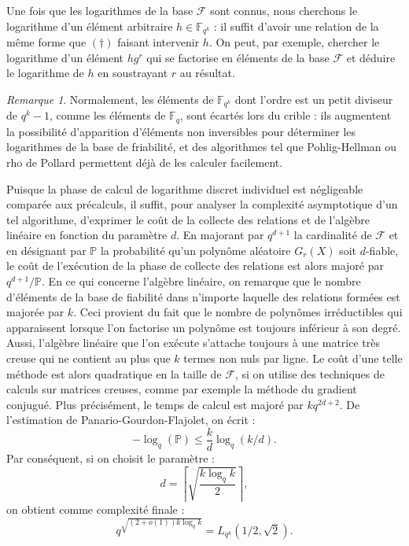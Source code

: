 \documentclass[a4paper, titlepage, 11pt]{article}
\theoremstyle{definition}
\theoremstyle{remark}
\newtheorem{rema}[theo]{Remarque}
\def\o{o}
\def\gf #1{\mathbb{F}_{#1}}
\begin{document}
Une fois que les logarithmes de la base $\mathcal{F}$ sont connus, nous cherchons le logarithme d'un élément arbitraire $h \in \gf{q^k}$ : il suffit d'avoir une relation de la même forme que $(\dagger)$ faisant intervenir $h$. On peut, par exemple, chercher le logarithme d'un élément $hg^r$ qui se factorise en éléments de la base $\mathcal{F}$ et déduire le logarithme de $h$ en soustrayant $r$ au résultat.

\begin{rema}
Normalement, les éléments de $\gf{q^k}$ dont l'ordre est un petit diviseur de $q^k-1$, comme les éléments de $\gf{q}$, sont écartés lors du crible : ils augmentent la possibilité d'apparition d'éléments non inversibles pour déterminer les logarithmes de la base de friabilité, et des algorithmes tel que Pohlig-Hellman \cite{pohligHellman1978} ou rho de Pollard \cite{pollard1978} permettent déjà de les calculer facilement.
\end{rema}

Puisque la phase de calcul de logarithme discret individuel est négligeable comparée aux précalculs, il suffit, pour analyser la complexité asymptotique d'un tel algorithme, d'exprimer le coût de la collecte des relations et de l'algèbre linéaire en fonction du paramètre $d$. En majorant par $q^{d+1}$ la cardinalité de $\mathcal{F}$ et en désignant par $\mathbb{P}$ la probabilité qu'un polynôme aléatoire $G_r(X)$ soit $d$-fiable, le coût de l'exécution de la phase de collecte des relations est alors majoré par $q^{d+1}/\mathbb{P}$. En ce qui concerne l'algèbre linéaire, on remarque que le nombre d'éléments de la base de fiabilité dans n'importe laquelle des relations formées est majorée par $k$. Ceci provient du fait que le nombre de polynômes irréductibles qui apparaissent lorsque l'on factorise un polynôme est toujours inférieur à son degré. Aussi, l’algèbre linéaire que l'on exécute s'attache toujours à une matrice très creuse qui ne contient au plus que $k$ termes non nuls par ligne. Le coût d'une telle méthode est alors quadratique en la taille de $\mathcal{F}$, si on utilise des techniques de calculs sur matrices creuses, comme par exemple la méthode du gradient conjugué. Plus précisément, le temps de calcul est majoré par $kq^{2d+2}$. De l'estimation de Panario-Gourdon-Flajolet, on écrit :
$$-\log_q(\mathbb{P}) \leqslant\frac{k}{d}\log_q(k/d).$$
Par conséquent, si on choisit le paramètre :
$$d = \left\lceil \sqrt{ \frac{k\log_q k}{2} } \right\rceil,$$
on obtient comme complexité finale :
$$q^{\sqrt{(2+\o(1))k\log_qk}} = L_{q^k}(1/2,\sqrt 2).$$
\end{document}
